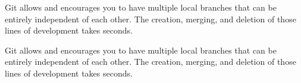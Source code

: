 Git allows and encourages you to have multiple local branches that can be entirely independent of each other. The creation, merging, and deletion of those lines of development takes seconds.


Git allows and encourages you to have multiple local branches that can be entirely independent of each other. The creation, merging, and deletion of those lines of development takes seconds.

